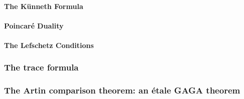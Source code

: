                 \paragraph{The K\"unneth Formula}
                
                \paragraph{Poincar\'e Duality}
            
                \paragraph{The Lefschetz Conditions}
                
            \subsubsection{The trace formula}
        
            \subsubsection{The Artin comparison theorem: an \'etale GAGA theorem}